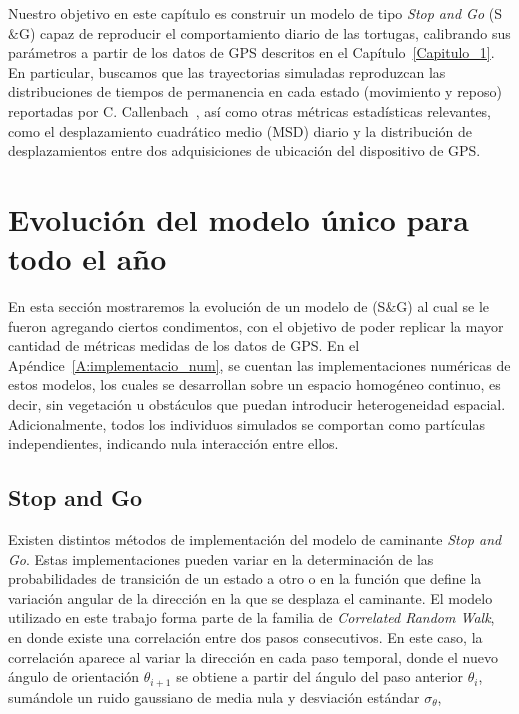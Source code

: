Nuestro objetivo en este capítulo es construir un modelo de tipo \textit{Stop and Go} (S$\&$G) capaz de reproducir el comportamiento diario de las tortugas, calibrando 
sus parámetros a partir de los datos de GPS descritos en el Capítulo~\ref{Capitulo_1}. En particular, buscamos que las trayectorias simuladas reproduzcan 
las distribuciones de tiempos de permanencia en cada estado (movimiento y reposo) reportadas por C. Callenbach~\cite{callenbach2025}, así como otras métricas
estadísticas relevantes, como el desplazamiento cuadrático medio (MSD) diario y la distribución de desplazamientos entre dos adquisiciones de ubicación del dispositivo de GPS.

\section{Evolución del modelo único para todo el año}\label{II:modelo_unico}

En esta sección mostraremos la evolución de un modelo de (S$\&$G) al cual se le fueron agregando ciertos condimentos, con el objetivo de poder replicar la mayor cantidad de 
métricas medidas de los datos de GPS. En el Apéndice~\ref{A:implementacio_num}, se cuentan las implementaciones numéricas de estos modelos, los cuales se desarrollan
sobre un espacio homogéneo continuo, es decir, sin vegetación u obstáculos que puedan introducir heterogeneidad espacial. Adicionalmente, todos los individuos 
simulados se comportan como partículas independientes, indicando nula interacción entre ellos.

\subsection*{Stop and Go}

Existen distintos métodos de implementación del modelo de caminante \textit{Stop and Go}. Estas implementaciones pueden variar en la determinación de las 
probabilidades de transición de un estado a otro o en la función que define la variación angular de la dirección en la que se desplaza el caminante.
El modelo utilizado en este trabajo forma parte de la familia de \textit{Correlated Random Walk}, en donde existe una correlación entre dos pasos consecutivos. 
En este caso, la correlación aparece al variar la dirección en cada paso temporal, donde el nuevo ángulo de orientación $\theta_{i+1}$ se obtiene a partir del 
ángulo del paso anterior $\theta_i$, sumándole un ruido gaussiano de media nula y desviación estándar $\sigma_\theta$,

